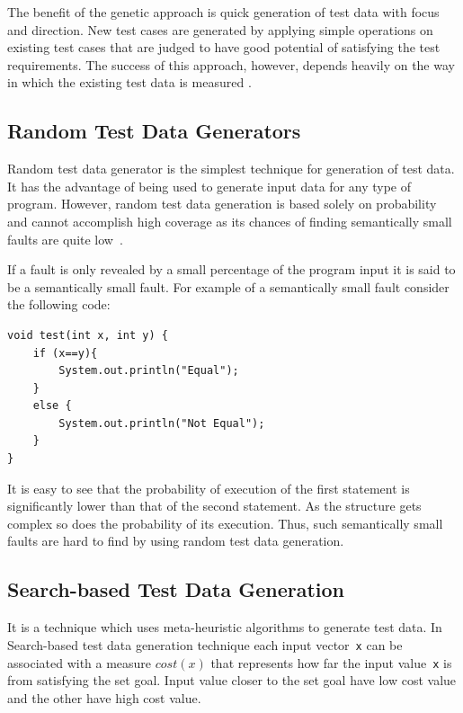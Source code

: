 The benefit of the genetic approach is quick generation of test data with focus and direction. New test cases are generated by applying simple operations on existing test cases that are judged to have good potential of satisfying the test requirements. The success of this approach, however, depends heavily on the way in which the existing test data is measured \cite{pargas1999test}.


\subsection{Random Test Data Generators}
\label{sec:randomgenerator_2}
Random test data generator is the simplest technique for generation of test data. It has the advantage of being used to generate input data for any type of program. However, random test data generation is based solely on probability and cannot accomplish high coverage as its chances of finding semantically small faults are quite low~\cite{godefroid2005dart}.

If a fault is only revealed by a small percentage of the program input it is said to be a semantically small fault. For example of a semantically small fault consider the following code:
\begin{lstlisting}
void test(int x, int y) {
    if (x==y){
        System.out.println("Equal");
    }
    else {
        System.out.println("Not Equal");
    }
}
\end{lstlisting}

It is easy to see that the probability of execution of the first statement is significantly lower than that of the second statement. As the structure gets complex so does the probability of its execution. Thus, such semantically small faults are hard to find by using random test data generation. 

\subsection{Search-based Test Data Generation}
It is a technique which uses meta-heuristic algorithms to generate test data. In Search-based test data generation technique each input vector~\verb+x+ can be associated with a measure $cost(x)$ that represents how far the input value~\verb+x+ is from satisfying the set goal. Input value closer to the set goal have low cost value and the other have high cost value. 

